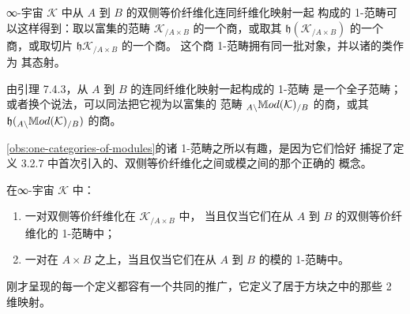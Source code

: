 \begin{observation}[模与纤维化映射的 1-范畴]\label{obs:one-categories-of-modules}
∞-宇宙 $\mathcal{K}$ 中从 $A$ 到 $B$ 的双侧等价纤维化连同纤维化映射一起
构成的 1-范畴可以这样得到：取以\trQuasiCategory{}富集的范畴
$\mathcal{K}_{/A\times B}$ 的一个商，或取其\trHomotopyTwoCategory{}
$\mathfrak{h}(\mathcal{K}_{/A\times B})$ 的一个商，或取切片%
\trHomotopyTwoCategory{} $\mathfrak{h}\mathcal{K}_{/A\times B}$ 的一个商。
这个商 1-范畴拥有同一批对象，并以诸\trFunctor{}的\trIsomorphism{}类作为
其态射。

由引理 7.4.3，从 $A$ 到 $B$ 的\trModule{}连同纤维化映射一起构成的 1-范畴
是一个全子范畴；或者换个说法，可以同法把它视为以\trKanComplex{}富集的
范畴 ${}_{A\backslash}\mathbb{M}od(\mathcal{K})_{/B}$ 的商，或其%
\trHomotopyTwoCategory{} $\mathfrak{h}({}_{A\backslash}\mathbb{M}od(\mathcal{K})_{/B})$
的商。
\end{observation}

\cref{obs:one-categories-of-modules}的诸 1-范畴之所以有趣，是因为它们恰好
捕捉了定义 3.2.7 中首次引入的、双侧等价纤维化之间或模之间的那个正确的%
\trEquivalence{}概念。

\begin{lemma}\label{lem:one-category-equivalences}
在∞-宇宙 $\mathcal{K}$ 中：
\begin{enumerate}[label=(\roman*)]
\item 一对双侧等价纤维化在 $\mathcal{K}_{/A\times B}$ 中\trEquivalence{}，
当且仅当它们在从 $A$ 到 $B$ 的双侧等价纤维化的 1-范畴中\trIsomorphism{}；
\item 一对\trModule{}在 $A\times B$ 之上\trEquivalence{}，当且仅当它们在从
$A$ 到 $B$ 的模的 1-范畴中\trIsomorphism{}。
\end{enumerate}
\end{lemma}

刚才呈现的每一个定义都容有一个共同的推广，它定义了居于方块之中的那些
2 维映射。

